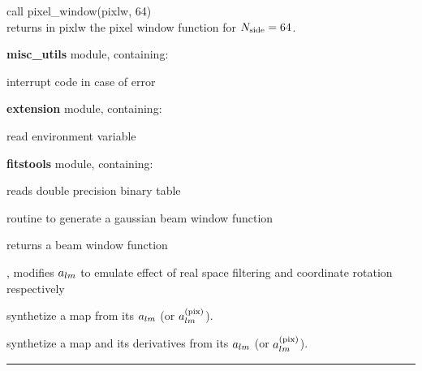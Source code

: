 \begin{example}
{
call pixel\_window(pixlw, 64)  \\
}
{
returns in pixlw the pixel window function for $N_\mathrm{side} = 64$.
}
\end{example}

\begin{modules}
  \begin{sulist}{} %
  \item[\textbf{misc\_utils}] module, containing:
      \item[\htmlref{assert, fatal\_error}{sub:assert}] interrupt code in case of error
  \item[\textbf{extension}] module, containing:
     \item[\htmlref{getEnvironment}{sub:getenvironment}] read environment variable
  \item[\textbf{fitstools}] module, containing:
     \item[\htmlref{read\_dbintab}{sub:read_dbintab}] reads double precision binary table
  \end{sulist}
\end{modules}

\begin{related}
  \begin{sulist}{} %
  \item[\htmlref{gaussbeam}{sub:gaussbeam}] routine to generate a gaussian
beam window function
  \item[\htmlref{generate\_beam}{sub:generate_beam}] returns a beam window function
  \item[\htmlref{alter\_alm}{sub:alter_alm}, \htmlref{rotate\_alm}{sub:rotate_alm}] modifies $a_{l m}$ to emulate effect
of real space filtering and coordinate rotation respectively
  \item[\htmlref{alm2map}{sub:alm2map}] synthetize a \healpix map from its $a_{l m}$
(or $a_{l m}^\mathrm{(pix)}$).
  \item[\htmlref{alm2map\_der}{sub:alm2map_der}] synthetize a map and its
derivatives from its $a_{l m}$ (or $a_{l m}^\mathrm{(pix)}$).
  \end{sulist}
\end{related}

\rule{\hsize}{2mm}

\newpage
